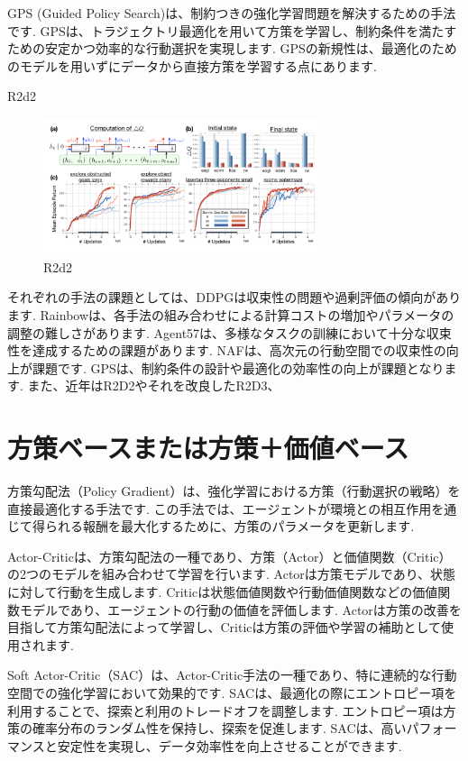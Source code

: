 \documentclass[a4j, twocolumn, 10pt,pdflatex,ja=standard]{bxjsarticle}
\begin{document}
GPS (Guided Policy Search)\cite{gps}は、制約つきの強化学習問題を解決するための手法です. GPSは、トラジェクトリ最適化を用いて方策を学習し、制約条件を満たすための安定かつ効率的な行動選択を実現します. GPSの新規性は、最適化のためのモデルを用いずにデータから直接方策を学習する点にあります. 

R2d2 

\begin{figure}[htbp]
 \begin{center}
 \includegraphics[height=4cm]{./figure/r2d2.png}
 \caption{R2d2}
 \label{fig:mri}
 \end{center}
\end{figure}
\vspace{-9mm}

それぞれの手法の課題としては、DDPGは収束性の問題や過剰評価の傾向があります. Rainbowは、各手法の組み合わせによる計算コストの増加やパラメータの調整の難しさがあります. Agent57は、多様なタスクの訓練において十分な収束性を達成するための課題があります. NAFは、高次元の行動空間での収束性の向上が課題です. GPSは、制約条件の設計や最適化の効率性の向上が課題となります. また、近年はR2D2\cite{r2d2}やそれを改良したR2D3\cite{r2d3}、


\section{方策ベースまたは方策＋価値ベース}

方策勾配法（Policy Gradient）は、強化学習における方策（行動選択の戦略）を直接最適化する手法です. この手法では、エージェントが環境との相互作用を通じて得られる報酬を最大化するために、方策のパラメータを更新します. 

Actor-Criticは、方策勾配法の一種であり、方策（Actor）と価値関数（Critic）の2つのモデルを組み合わせて学習を行います. Actorは方策モデルであり、状態に対して行動を生成します. Criticは状態価値関数や行動価値関数などの価値関数モデルであり、エージェントの行動の価値を評価します. Actorは方策の改善を目指して方策勾配法によって学習し、Criticは方策の評価や学習の補助として使用されます. 

Soft
Actor-Critic（SAC）は、Actor-Critic手法の一種であり、特に連続的な行動空間での強化学習において効果的です. SACは、最適化の際にエントロピー項を利用することで、探索と利用のトレードオフを調整します. エントロピー項は方策の確率分布のランダム性を保持し、探索を促進します. SACは、高いパフォーマンスと安定性を実現し、データ効率性を向上させることができます. 
\end{document}
